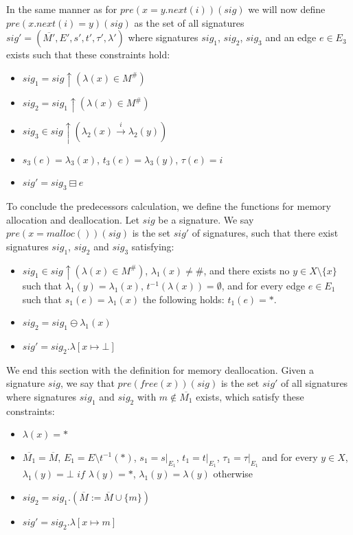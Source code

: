 \noindent
In the same manner as for  $pre(x = y.next(i))(sig)$ we will now define\\
$pre(x.next(i) = y)(sig)$ as the set of all signatures
$sig' = (\overline{M'}, E', s', t', \tau', \lambda')$ where signatures $sig_1$, $sig_2$, $sig_3$ and an edge $e \in E_3$ exists
such that these constraints hold:

\begin{itemize}
	\item $sig_1 = sig\uparrow(\lambda(x) \in M^{\#})$
	\item $sig_2 = sig_1\uparrow(\lambda(x) \in M^{\#})$
	\item $sig_3 \in sig\uparrow(\lambda_2(x) \xrightarrow{i} \lambda_2(y))$
	\item $s_3(e) = \lambda_3(x)$, $t_3(e) = \lambda_3(y)$, $\tau(e) = i$
	\item $sig' = sig_3 \boxminus e$
\end{itemize}

\noindent
To conclude the predecessors calculation, we define the functions for memory allocation and deallocation.
Let $sig$ be a signature. We say $pre(x = malloc())(sig)$ is the set $sig'$ of signatures, such that there exist signatures
$sig_1$, $sig_2$ and $sig_3$ satisfying:

\begin{itemize}
	\item $sig_1 \in sig\uparrow(\lambda(x) \in M^{\#})$, $\lambda_1(x) \not= \#$, and there exists no $y \in X \setminus \{x\}$
	such that $\lambda_1(y) = \lambda_1(x)$, $t^{-1}(\lambda(x)) = \emptyset$, and for every edge $e \in E_1$ such that
	$s_1(e) = \lambda_1(x)$ the following holds: $t_1(e) = *$.
	\item $sig_2 = sig_1 \ominus \lambda_1(x)$
	\item $sig' = sig_2.\lambda[x \mapsto \bot]$
\end{itemize}

\noindent
We end this section with the definition for memory deallocation.
Given a signature $sig$, we say that $pre(free(x))(sig)$ is the set $sig'$ of all signatures where signatures $sig_1$ and $sig_2$
with $m \not\in \overline{M_1}$ exists, which satisfy these constraints:

\begin{itemize}
	\item $\lambda(x) = *$
	\item $\overline{M_1} = \overline{M}$, $E_1 = E \setminus t^{-1}(*)$, $s_1 = s|_{E_1}$, $t_1 = t|_{E_1}$, $\tau_1 = \tau|_{E_1}$
	and for every $y \in X$, $\lambda_1(y) = \bot$ $if$ $\lambda(y) = *$, $\lambda_1(y) = \lambda(y)$ otherwise
	\item $sig_2 = sig_1.(\overline{M} := \overline{M} \cup \{m\})$
	\item $sig' = sig_2.\lambda[x \mapsto m]$
\end{itemize}

